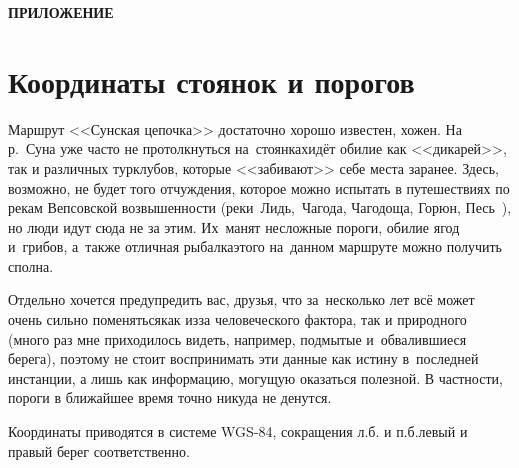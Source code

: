 {
\cleardoublepage
{}

\fancyhead[LE]{\fancyplain{}{}}
\fancyhead[RO]{\fancyplain{}{}}

{\hfill\large\textbf{ПРИЛОЖЕНИЕ}}

\vspace{2.5\baselineskip}

\section*{Координаты стоянок и порогов}

\vspace{2.5\baselineskip}

Маршрут <<Сунская цепочка>> достаточно хорошо известен, хожен. На р.\nobreakdash~Суна уже часто не протолкнуться на~стоянках\mdash идёт обилие как <<дикарей>>, так и различных турклубов, которые <<забивают>> себе места заранее. Здесь, возможно, не будет того отчуждения, которое можно испытать в путешествиях по рекам Вепсовской возвышенности (реки~Лидь,~Чагода, Чагодоща, Горюн, Песь~\cite{СоболевЛидьЧагодаЧагодоща}), но люди идут сюда не за этим. Их~манят несложные пороги, обилие ягод и~грибов, а~также отличная рыбалка\mdash этого на~данном маршруте можно получить сполна. 


Отдельно хочется предупредить вас, друзья, что за~несколько лет всё может очень сильно поменяться\mdash как из\sdash за человеческого фактора, так и природного (много раз мне приходилось видеть, например, подмытые и~обвалившиеся берега), поэтому не стоит воспринимать эти данные как истину в~последней инстанции, а лишь как информацию, могущую оказаться полезной. В частности, пороги в ближайшее время точно никуда не денутся.

Координаты приводятся в системе WGS-84, сокращения л.б. и п.б.\mdash левый и правый берег соответственно.

%
\newpage 
}
